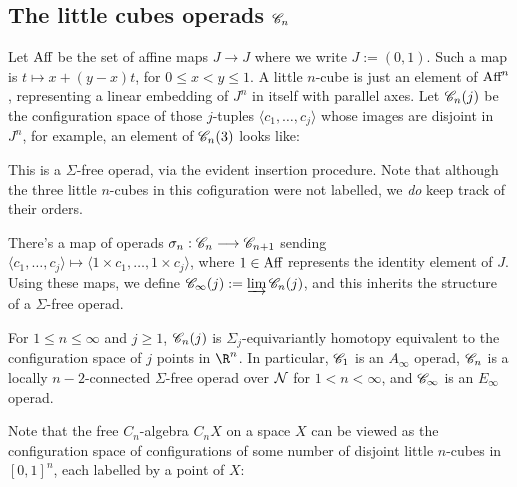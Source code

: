 \documentclass[11pt]{article}
\newcommand{\Aff}{\textup{Aff}}
\newcommand{\labsq}[6][0]{
\draw (#2+#1,#3)--(#4+#1,#3)--(#4+#1,#5)--(#2+#1,#5)-- cycle;
\path (.5*#2+.5*#4+#1,.5*#3+.5*#5) node[font=\scriptsize] {#6};
}
\begin{document}
\begin{chapter4-6}
\setcounter{section}{3}
\section{The little cubes operads \texorpdfstring{$\mathscr{C}_n$}{Cn}}
Let $\Aff$ be the set of affine maps $J\to J$ where we write $J:=(0,1)$. Such a map is $t\mapsto x+(y-x)t$, for $0\leq x<y\leq1$. A little $n$-cube is just an element of $\Aff^n$, representing a linear embedding of $J^n$ in itself with parallel axes. Let $\mathscr{C}_n(j)$ be the configuration space of those $j$-tuples $\langle c_1,\ldots,c_j\rangle$ whose images are disjoint in $J^n$, for example, an element of $\mathscr{C}_n(3)$ looks like:
\begin{center}
\end{center}
This is a $\Sigma$-free operad, via the evident insertion procedure. Note that although the three little $n$-cubes in this cofiguration were not labelled, we \emph{do} keep track of their orders.

There's a map of operads $\sigma_{n}:\mathscr{C}_n\longrightarrow\mathscr{C}_{n+1}$ sending $\langle c_1,\ldots,c_j\rangle\mapsto\langle 1\times c_1,\ldots,1\times c_j\rangle$, where $1\in\Aff$ represents the identity element of $J$. Using these maps, we define $\mathscr{C}_\infty(j):=\varinjlim\mathscr{C}_n(j)$, and this inherits the structure of a $\Sigma$-free operad.
\begin{thm*}[4.8]
For $1\leq n\leq\infty$ and $j\geq1$, $\mathscr{C}_n(j)$ is $\Sigma_j$-equivariantly homotopy equivalent to the configuration space of $j$ points in $\R^n$. In particular, $\mathscr{C}_1$ is an $A_\infty$ operad, $\mathscr{C}_n$ is a locally $n-2$-connected $\Sigma$-free operad over $\mathcal{N}$ for $1<n<\infty$, and $\mathscr{C}_\infty$ is an $E_\infty$ operad.
\end{thm*}

Note that the free $C_n$-algebra $C_nX$ on a space $X$ can be viewed as the configuration space of configurations of some number of disjoint little $n$-cubes in $[0,1]^n$, each labelled by a point of $X$:
\begin{center}
\end{center}
\end{chapter4-6}
\end{document}
